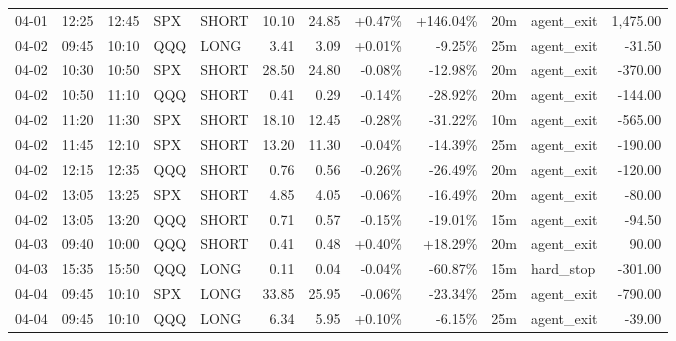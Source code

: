 \documentclass[11pt,a4paper]{article}
\begin{document}
\begin{center}
\begin{longtable}{>{\color{txtmain}}l l l l l r r r r r >{\color{txtmain}}l r}
04-01 & 12:25 & 12:45 & SPX & SHORT & 10.10 & 24.85 & \textcolor{wingreen}{+0.47\%} & \textcolor{wingreen}{+146.04\%} & 20m & agent\_exit & \textcolor{wingreen}{1,475.00} \\
04-02 & 09:45 & 10:10 & QQQ & LONG & 3.41 & 3.09 & \textcolor{wingreen}{+0.01\%} & \textcolor{lossred}{-9.25\%} & 25m & agent\_exit & \textcolor{lossred}{-31.50} \\
04-02 & 10:30 & 10:50 & SPX & SHORT & 28.50 & 24.80 & \textcolor{lossred}{-0.08\%} & \textcolor{lossred}{-12.98\%} & 20m & agent\_exit & \textcolor{lossred}{-370.00} \\
04-02 & 10:50 & 11:10 & QQQ & SHORT & 0.41 & 0.29 & \textcolor{lossred}{-0.14\%} & \textcolor{lossred}{-28.92\%} & 20m & agent\_exit & \textcolor{lossred}{-144.00} \\
04-02 & 11:20 & 11:30 & SPX & SHORT & 18.10 & 12.45 & \textcolor{lossred}{-0.28\%} & \textcolor{lossred}{-31.22\%} & 10m & agent\_exit & \textcolor{lossred}{-565.00} \\
04-02 & 11:45 & 12:10 & SPX & SHORT & 13.20 & 11.30 & \textcolor{lossred}{-0.04\%} & \textcolor{lossred}{-14.39\%} & 25m & agent\_exit & \textcolor{lossred}{-190.00} \\
04-02 & 12:15 & 12:35 & QQQ & SHORT & 0.76 & 0.56 & \textcolor{lossred}{-0.26\%} & \textcolor{lossred}{-26.49\%} & 20m & agent\_exit & \textcolor{lossred}{-120.00} \\
04-02 & 13:05 & 13:25 & SPX & SHORT & 4.85 & 4.05 & \textcolor{lossred}{-0.06\%} & \textcolor{lossred}{-16.49\%} & 20m & agent\_exit & \textcolor{lossred}{-80.00} \\
04-02 & 13:05 & 13:20 & QQQ & SHORT & 0.71 & 0.57 & \textcolor{lossred}{-0.15\%} & \textcolor{lossred}{-19.01\%} & 15m & agent\_exit & \textcolor{lossred}{-94.50} \\
04-03 & 09:40 & 10:00 & QQQ & SHORT & 0.41 & 0.48 & \textcolor{wingreen}{+0.40\%} & \textcolor{wingreen}{+18.29\%} & 20m & agent\_exit & \textcolor{wingreen}{90.00} \\
04-03 & 15:35 & 15:50 & QQQ & LONG & 0.11 & 0.04 & \textcolor{lossred}{-0.04\%} & \textcolor{lossred}{-60.87\%} & 15m & hard\_stop & \textcolor{lossred}{-301.00} \\
04-04 & 09:45 & 10:10 & SPX & LONG & 33.85 & 25.95 & \textcolor{lossred}{-0.06\%} & \textcolor{lossred}{-23.34\%} & 25m & agent\_exit & \textcolor{lossred}{-790.00} \\
04-04 & 09:45 & 10:10 & QQQ & LONG & 6.34 & 5.95 & \textcolor{wingreen}{+0.10\%} & \textcolor{lossred}{-6.15\%} & 25m & agent\_exit & \textcolor{lossred}{-39.00} \\

\end{longtable}
\end{center}
\end{document}
